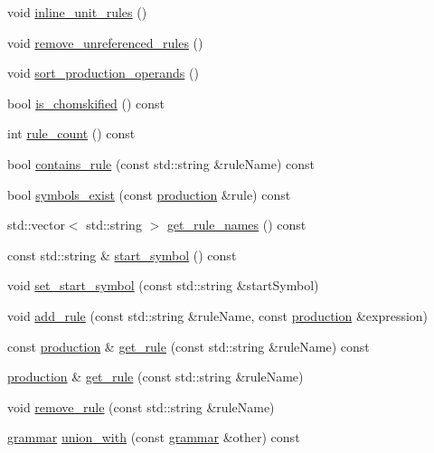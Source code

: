 \begin{DoxyCompactItemize}
\item 
void \mbox{\hyperlink{classgrammar_a91f3c8916ed850bc38f347480349c123}{inline\+\_\+unit\+\_\+rules}} ()
\item 
void \mbox{\hyperlink{classgrammar_ac0ec80f1ed9e863f1367a92a2d9393dc}{remove\+\_\+unreferenced\+\_\+rules}} ()
\item 
void \mbox{\hyperlink{classgrammar_ae3145b76d7016e89e749a609eac53f5c}{sort\+\_\+production\+\_\+operands}} ()
\item 
bool \mbox{\hyperlink{classgrammar_a1be2558728bfb9d77d4f7dc373dc00d2}{is\+\_\+chomskified}} () const
\item 
int \mbox{\hyperlink{classgrammar_a5a3bc8f800c26c55673bca0399e471d2}{rule\+\_\+count}} () const
\item 
bool \mbox{\hyperlink{classgrammar_a9a1fc73cfb8f5635fd6fda5861333f1c}{contains\+\_\+rule}} (const std\+::string \&rule\+Name) const
\item 
bool \mbox{\hyperlink{classgrammar_a6c8d5e930806290a3fb86b73cceedd29}{symbols\+\_\+exist}} (const \mbox{\hyperlink{classproduction}{production}} \&rule) const
\item 
std\+::vector$<$ std\+::string $>$ \mbox{\hyperlink{classgrammar_a20f84bcd1749e5b68340b45f247a532b}{get\+\_\+rule\+\_\+names}} () const
\item 
const std\+::string \& \mbox{\hyperlink{classgrammar_afb48ec09952ff17ef932669758b4b15c}{start\+\_\+symbol}} () const
\item 
void \mbox{\hyperlink{classgrammar_ac0fc0535d0b161a1d6ca2ccc8e057aa0}{set\+\_\+start\+\_\+symbol}} (const std\+::string \&start\+Symbol)
\item 
void \mbox{\hyperlink{classgrammar_abb216d5ac0bb7052b84372f7f13ceb6b}{add\+\_\+rule}} (const std\+::string \&rule\+Name, const \mbox{\hyperlink{classproduction}{production}} \&expression)
\item 
const \mbox{\hyperlink{classproduction}{production}} \& \mbox{\hyperlink{classgrammar_a0a159a4ba2e48cd321f7f0653ba2e078}{get\+\_\+rule}} (const std\+::string \&rule\+Name) const
\item 
\mbox{\hyperlink{classproduction}{production}} \& \mbox{\hyperlink{classgrammar_ad4b972df16ac59d6f81a3ca9d875beff}{get\+\_\+rule}} (const std\+::string \&rule\+Name)
\item 
void \mbox{\hyperlink{classgrammar_a63fe5a10e250e6925b0de9dce5b31127}{remove\+\_\+rule}} (const std\+::string \&rule\+Name)
\item 
\mbox{\hyperlink{classgrammar}{grammar}} \mbox{\hyperlink{classgrammar_a4fe5e40e6f636f65e42f8a0364cdbf4f}{union\+\_\+with}} (const \mbox{\hyperlink{classgrammar}{grammar}} \&other) const

\end{DoxyCompactItemize}
